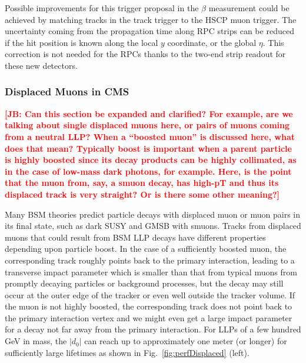 Possible improvements for this trigger proposal in the $\beta$ measurement could be achieved by matching tracks in the track trigger to the HSCP muon trigger. The uncertainty coming from the propagation time along RPC strips can be reduced if the hit position is known along the local $y$ coordinate, or the global $\eta$. This correction is not needed for the RPCs thanks to the two-end strip readout for these new detectors.

\subsubsection{Displaced Muons in CMS} 

{\bf \textcolor{red}{[JB: Can this section be expanded and clarified?  For example, are we talking about single displaced muons here, or pairs of muons coming from a neutral LLP?  When a ``boosted muon'' is discussed here, what does that mean?  Typically boost is important when a parent particle is highly boosted since its decay products can be highly collimated, as in the case of low-mass dark photons, for example.  Here, is the point that the muon from, say, a smuon decay, has high-pT and thus its displaced track is very straight?  Or is there some other meaning?]}}

Many BSM theories predict particle decays with displaced muon or muon pairs in its final state, such as dark SUSY and GMSB with smuons. Tracks from displaced muons that could result from BSM LLP decays have different properties depending upon particle boost. In the case of a sufficiently boosted muon, the corresponding track roughly points back to the primary interaction, leading to a transverse impact parameter which is smaller than that from typical muons from promptly decaying particles or background processes, but the decay may still occur at the outer edge of the tracker or even well outside the tracker volume. If the muon is not highly boosted, the corresponding track does not point back to the primary interaction vertex and we might even get a large impact parameter for a decay not far away from the primary interaction. For LLPs of a few hundred GeV in mass, the $|d_0|$ can reach up to approximately one meter (or longer) for sufficiently large lifetimes as shown in Fig.~\ref{fig:perfDisplaced} (left).

